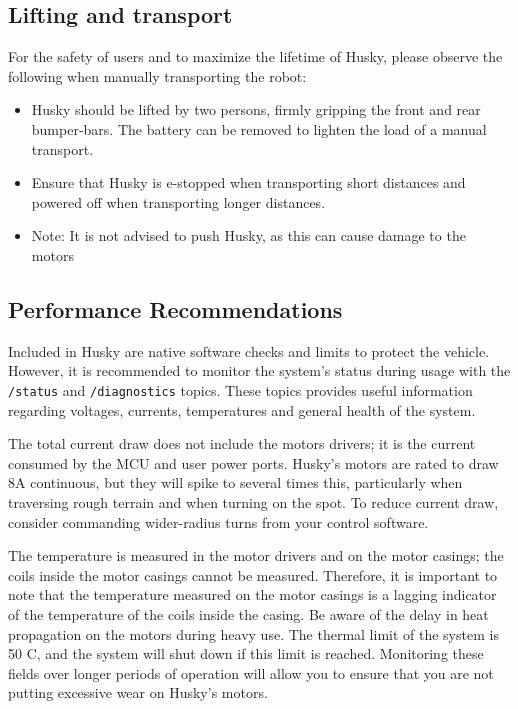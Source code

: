 \documentclass[]{clearpath-latex/clearpath-manual}
\begin{document}
\subsection{Lifting and transport}
For the safety of users and to maximize the lifetime of Husky, please observe the following when manually transporting the robot:

\begin{itemize}
		\item Husky should be lifted by two persons, firmly gripping the front and rear bumper-bars.
		The battery can be removed to lighten the load of a manual transport.
		\item Ensure that Husky is e-stopped when transporting short distances and powered off when transporting
		longer distances.
		\item Note: It is not advised to push Husky, as this can cause damage to the motors
\end{itemize}
\newpage

\subsection{Performance Recommendations}

Included in Husky are native software checks and limits to protect the vehicle. However,
it is recommended to monitor the system’s status during usage with the \lstinline{/status} and \lstinline{/diagnostics} topics.
These topics provides useful information regarding voltages, currents, temperatures and general health of the system.

The total current draw does not include the motors drivers; it is the current consumed by the MCU and user power ports.
Husky’s motors are rated to draw 8A continuous, but they will spike to several times this, particularly when traversing
rough terrain and when turning on the spot. To reduce current draw, consider commanding wider-radius turns from
your control software.

The temperature is measured in the motor drivers and on the motor casings; the coils inside the motor casings cannot be measured.
Therefore, it is important to note that the temperature measured on the motor casings is a lagging indicator of
the temperature of the coils inside the casing. Be aware of the delay in heat propagation on the motors during heavy use.
The thermal limit of the system is 50 C\degree, and the system will shut down if this limit is reached.
Monitoring these fields over longer periods of operation will allow you to ensure that you are not putting
excessive wear on Husky's motors.
\newpage
\end{document}
